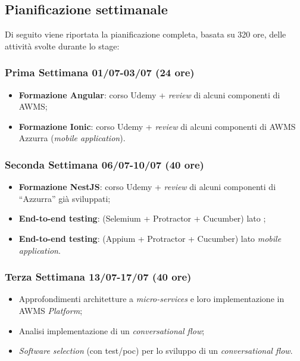\subsection{Pianificazione settimanale}
Di seguito viene riportata la pianificazione completa, basata su 320 ore, delle attività svolte durante lo stage:
\begin{trivlist}
	\item \subsubsection{Prima Settimana 01/07-03/07 (24 ore)}   
	\begin{itemize}
		\item \textbf{Formazione Angular}: corso Udemy + \emph{review} di alcuni componenti di \gls{AWMS};
		\item \textbf{Formazione Ionic}: corso Udemy + \emph{review} di alcuni componenti di \gls{AWMS} Azzurra (\emph{mobile application}).
	\end{itemize}  

\item \subsubsection{Seconda Settimana 06/07-10/07 (40 ore)}
\begin{itemize}
	\item \textbf{Formazione NestJS}: corso Udemy + \emph{review} di alcuni componenti di “Azzurra” già sviluppati;
	\item \textbf{End-to-end testing}: (Selemium + Protractor + Cucumber) lato ;
	\item \textbf{End-to-end testing}: (Appium + Protractor + Cucumber) lato \emph{mobile} \emph{application}.
\end{itemize}

\item \subsubsection{Terza Settimana 13/07-17/07 (40 ore)}
\begin{itemize}
	\item Approfondimenti architetture a \emph{micro-services} e loro implementazione in \gls{AWMS} \emph{Platform};
	\item Analisi implementazione di un \emph{conversational flow};
	\item \emph{Software selection} (con test/poc) per lo sviluppo di un \emph{conversational flow}.
\end{itemize}	


\end{trivlist}
